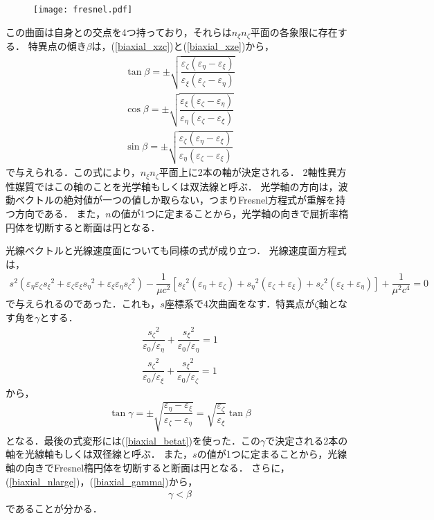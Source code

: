 \begin{figure}[ht]
  \centering
  \texttt{[image: fresnel.pdf]}
  \caption{}
  \label{fresnel}
\end{figure}

この曲面は自身との交点を4つ持っており，それらは$n_\xi{}n_\zeta$平面の各象限に存在する．
特異点の傾き$\beta$は，(\ref{biaxial_xzc})と(\ref{biaxial_xze})から，
\begin{align}
  \tan\beta=\pm\sqrt{\dfrac{\varepsilon_\zeta(\varepsilon_\eta-\varepsilon_\xi)}{\varepsilon_\xi(\varepsilon_\zeta-\varepsilon_\eta)}}\label{biaxial_betat}\\
  \cos\beta=\pm\sqrt{\dfrac{\varepsilon_\xi(\varepsilon_\zeta-\varepsilon_\eta)}{\varepsilon_\eta(\varepsilon_\zeta-\varepsilon_\xi)}}\label{biaxial_betac}\\
  \sin\beta=\pm\sqrt{\dfrac{\varepsilon_\zeta(\varepsilon_\eta-\varepsilon_\xi)}{\varepsilon_\eta(\varepsilon_\zeta-\varepsilon_\xi)}}\label{biaxial_betas}
\end{align}
で与えられる．この式により，$n_\xi{}n_\zeta$平面上に2本の軸が決定される．
2軸性異方性媒質ではこの軸のことを光学軸もしくは双法線と呼ぶ．
光学軸の方向は，波動ベクトルの絶対値が一つの値しか取らない，つまりFresnel方程式が重解を持つ方向である．
また，$n$の値が1つに定まることから，光学軸の向きで屈折率楕円体を切断すると断面は円となる．

光線ベクトルと光線速度面についても同様の式が成り立つ．
光線速度面方程式は，
\begin{align}
  s^2\left(\varepsilon_\eta\varepsilon_\zeta{s_\xi}^2 + \varepsilon_\zeta\varepsilon_\xi{s_\eta}^2 + \varepsilon_\xi\varepsilon_\eta{s_\zeta}^2\right)
  -\dfrac{1}{\mu{}c^2}\left[{s_\xi}^2(\varepsilon_\eta+\varepsilon_\zeta)+{s_\eta}^2(\varepsilon_\zeta+\varepsilon_\xi)+{s_\zeta}^2(\varepsilon_\xi+\varepsilon_\eta)\right]
  +\dfrac{1}{\mu^2c^4}=0
\end{align}
で与えられるのであった．これも，$s$座標系で4次曲面をなす．特異点が$\zeta$軸となす角を$\gamma$とする．
\begin{align}
  \dfrac{{s_\zeta}^2}{\varepsilon_0/\varepsilon_\eta}+\dfrac{{s_\xi}^2}{\varepsilon_0/\varepsilon_\eta}=1\label{biaxial_szxc}\\
  \dfrac{{s_\zeta}^2}{\varepsilon_0/\varepsilon_\xi}+\dfrac{{s_\xi}^2}{\varepsilon_0/\varepsilon_\zeta}=1\label{biaxial_szxe}
\end{align}
から，
\begin{align}
  \tan\gamma=\pm\sqrt{\dfrac{\varepsilon_\eta-\varepsilon_\xi}{\varepsilon_\zeta-\varepsilon_\eta}}=\sqrt{\dfrac{\varepsilon_\zeta}{\varepsilon_\xi}}\tan\beta\label{biaxial_gamma}
\end{align}
となる．最後の式変形には(\ref{biaxial_betat})を使った．この$\gamma$で決定される2本の軸を光線軸もしくは双径線と呼ぶ．
また，$s$の値が1つに定まることから，光線軸の向きでFresnel楕円体を切断すると断面は円となる．
さらに，(\ref{biaxial_nlarge})，(\ref{biaxial_gamma})から，
\begin{align}
  \gamma < \beta
\end{align}
であることが分かる．

